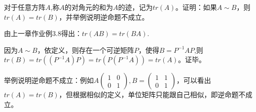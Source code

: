 \documentclass[a4paper]{report}
\begin{document}
\EX

\EX 

\EX 

\EX 
\EX 对于任意方阵$A$,称$A$的对角元的和为$A$的迹，记为$tr(A)$。证明：如果$A\sim B$，则$tr(A)=tr(B)$，并举例说明逆命题不成立。

\begin{zhengming}
由上一章作业例3.8得出：$tr(AB)=tr(BA)$.

因为$A\sim B$，依定义，则存在一个可逆矩阵$P$，使得$B=P^{-1}AP$,则$tr(B)=tr((P^{-1}A)P)=tr(P(P^{-1}A))=tr(A)$。证毕。

举例说明逆命题不成立：例如$A
\begin{pmatrix}
1&0\\0&1
\end{pmatrix},B=
\begin{pmatrix}
1&1\\
0&1
\end{pmatrix}
$，可以看出$tr(A)=tr(B)$，但根据相似的定义，单位矩阵只能跟自己相似，即逆命题不成立。
\end{zhengming}
\end{document}
